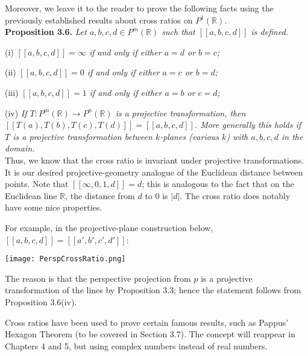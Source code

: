 \documentclass[leqno]{book}
\begin{document}
Moreover, we leave it to the reader to prove the following facts using the previously established results about cross ratios on $P^1(\mathbb R)$.\\

\noindent\textbf{Proposition 3.6.} \emph{Let $a,b,c,d\in P^m(\mathbb R)$ such that $[\![a,b,c,d]\!]$ is defined.}

(i) \emph{$[\![a,b,c,d]\!]=\infty$ if and only if either $a=d$ or $b=c$;}

(ii) \emph{$[\![a,b,c,d]\!]=0$ if and only if either $a=c$ or $b=d$;}

(iii) \emph{$[\![a,b,c,d]\!]=1$ if and only if either $a=b$ or $c=d$;}

(iv) \emph{If $T:P^m(\mathbb R)\to P^n(\mathbb R)$ is a projective transformation, then $[\![T(a),T(b),T(c),T(d)]\!]=[\![a,b,c,d]\!]$.  More generally this holds if $T$ is a projective transformation between $k$-planes (various $k$) with $a,b,c,d$ in the domain.}\\

\noindent Thus, we know that the cross ratio is invariant under projective transformations.  It is our desired projective-geometry analogue of the Euclidean distance between points.  Note that $[\![\infty,0,1,d]\!]=d$; this is analogous to the fact that on the Euclidean line $\mathbb R$, the distance from $d$ to $0$ is $|d|$.  The cross ratio does notably have some nice properties.

For example, in the projective-plane construction below, $[\![a,b,c,d]\!]=[\![a',b',c',d']\!]$:
\begin{center}\texttt{[image: PerspCrossRatio.png]}\end{center}
The reason is that the perspective projection from $p$ is a projective transformation of the lines by Proposition 3.3; hence the statement follows from Proposition 3.6(iv).

Cross ratios have been used to prove certain famous results, such as Pappus' Hexagon Theorem (to be covered in Section 3.7).  The concept will reappear in Chapters 4 and 5, but using complex numbers instead of real numbers.
\end{document}
